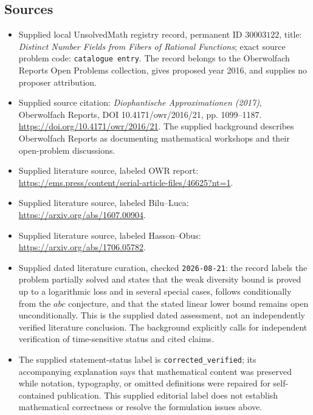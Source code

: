 \documentclass[11pt]{article}
\begin{document}
\subsection{Sources}
\begin{itemize}
\item Supplied local UnsolvedMath registry record, permanent ID \(30003122\), title: \emph{Distinct Number Fields from Fibers of Rational Functions}; exact source problem code: \texttt{catalogue entry}. The record belongs to the Oberwolfach Reports Open Problems collection, gives proposed year 2016, and supplies no proposer attribution.
\item Supplied source citation: \emph{Diophantische Approximationen (2017)}, Oberwolfach Reports, DOI 10.4171/owr/2016/21, pp. 1099--1187. \url{https://doi.org/10.4171/owr/2016/21}. The supplied background describes Oberwolfach Reports as documenting mathematical workshops and their open-problem discussions.
\item Supplied literature source, labeled OWR report: \url{https://ems.press/content/serial-article-files/46625?nt=1}.
\item Supplied literature source, labeled Bilu--Luca: \url{https://arxiv.org/abs/1607.00904}.
\item Supplied literature source, labeled Hasson--Obus: \url{https://arxiv.org/abs/1706.05782}.
\item Supplied dated literature curation, checked \texttt{2026-08-21}: the record labels the problem partially solved and states that the weak diversity bound is proved up to a logarithmic loss and in several special cases, follows conditionally from the \(abc\) conjecture, and that the stated linear lower bound remains open unconditionally. This is the supplied dated assessment, not an independently verified literature conclusion. The background explicitly calls for independent verification of time-sensitive status and cited claims.
\item The supplied statement-status label is \texttt{corrected\_verified}; its accompanying explanation says that mathematical content was preserved while notation, typography, or omitted definitions were repaired for self-contained publication. This supplied editorial label does not establish mathematical correctness or resolve the formulation issues above.
\end{itemize}
\end{document}
